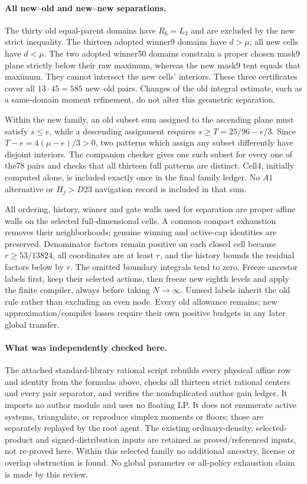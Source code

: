 \paragraph{All new--old and new--new separations.}
The thirty old equal-parent domains have $R_6=L_3$ and are excluded
by the new strict inequality. The thirteen adopted winner9 domains
have $d>\mu$; all new cells have $d<\mu$. The two adopted winner50
domains constrain a proper chosen mask9 plane strictly below their
raw maximum, whereas the new mask9 tent equals that maximum. They
cannot intersect the new cells' interiors. These three certificates
cover all $13\cdot45=585$ new--old pairs. Changes of the old integral
estimate, such as a same-domain moment refinement, do not alter this
geometric separation.

Within the new family, an old subset sum assigned to the ascending
plane must satisfy $s\le e$, while a descending assignment requires
$s\ge T=25/96-e/3$. Since $T-e=4(\mu-e)/3>0$, two patterns which
assign any subset differently have disjoint interiors. The companion
checker gives one such subset for every one of the78 pairs and checks
that all thirteen full patterns are distinct. Cell4, initially computed
alone, is included exactly once in the final family ledger. No $A1$
alternative or $H_j>D23$ navigation record is included in that sum.

All ordering, history, winner and gate walls used for separation are
proper affine walls on the selected full-dimensional cells. A common
compact exhaustion removes their neighborhoods; genuine winning and
active-cap identities are preserved. Denominator factors remain positive
on each closed cell because $r\ge53/13824$, all coordinates are at
least $r$, and the history bounds the residual factors below by $r$.
The omitted boundary integrals tend to zero. Freeze ancestor labels
first, keep their selected actions, then freeze new eighth levels and
apply the finite compiler, always before taking $N\to\infty$.
Unused labels inherit the old rule rather than excluding an even node.
Every old allowance remains; new approximation/compiler losses require
their own positive budgets in any later global transfer.

\paragraph{What was independently checked here.}
The attached standard-library rational script rebuilds every physical
affine row and identity from the formulas above, checks all thirteen
strict rational centers and every pair separator, and verifies the
nonduplicated author gain ledger. It imports no author module and uses
no floating LP. It does not enumerate active systems, triangulate,
or reproduce simplex moments or floors; those are separately replayed
by the root agent. The existing ordinary-density, selected-product and
signed-distribution inputs are retained as proved/referenced inputs,
not re-proved here. Within this selected family no additional ancestry,
license or overlap obstruction is found. No global parameter or
all-policy exhaustion claim is made by this review.
